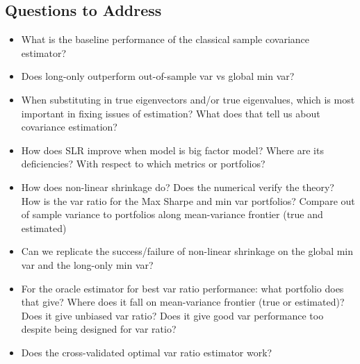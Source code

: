 \documentclass{article}
\begin{document}
\subsection{Questions to Address}

\begin{itemize}
	\item What is the baseline performance of the classical sample covariance estimator?
	
	\item Does long-only outperform out-of-sample var vs global min var?

	\item When substituting in true eigenvectors and/or true eigenvalues, which is most important in fixing issues of estimation?  What does that tell us about covariance estimation?

	\item How does SLR improve when model is big factor model?  Where are its deficiencies?  With respect to which metrics or portfolios?
	
	\item How does non-linear shrinkage do?  Does the numerical verify the theory?  How is the var ratio for the Max Sharpe and min var portfolios?  Compare out of sample variance to portfolios along mean-variance frontier (true and estimated)
	
	\item Can we replicate the success/failure of non-linear shrinkage on the global min var and the long-only min var?
	
	\item For the oracle estimator for best var ratio performance: what portfolio does that give? Where does it fall on mean-variance frontier (true or estimated)?  Does it give unbiased var ratio? Does it give good var performance too despite being designed for var ratio?
	
	\item Does the cross-validated optimal var ratio estimator work?
\end{itemize}






\end{document}
